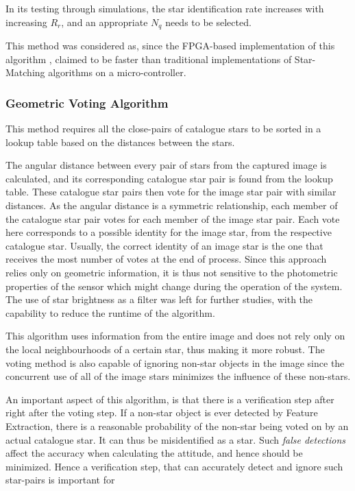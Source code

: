In its testing through simulations, the star identification rate increases with increasing $R_r$, and an appropriate $N_q$ needs to be selected.

This method was considered as, since the FPGA-based implementation of this algorithm \cite{zhao2017real}, claimed to be faster than traditional implementations of Star-Matching algorithms on a micro-controller.


\subsubsection{Geometric Voting Algorithm}
This method \cite{kolomenkin2008geometric} requires all the close-pairs of catalogue stars to be sorted in a lookup table based on the distances between the stars.

The angular distance between every pair of stars from the captured image is calculated, and its corresponding catalogue star pair is found from the lookup table. These catalogue star pairs then vote for the image star pair with similar distances. As the angular distance is a symmetric relationship, each member of the catalogue star pair votes for each member of the image star pair. 
Each vote here corresponds to a possible identity for the image star, from the respective catalogue star. Usually, the correct identity of an image star is the one that receives the most number of votes at the end of process. Since this approach relies only on geometric information, it is thus not sensitive to the photometric properties of the sensor which might change during the operation of the system.
The use of star brightness as a filter was left for further studies, with the capability to reduce the runtime of the algorithm.

This algorithm uses information from the entire image and does not rely only on the local neighbourhoods of a certain star, thus making it more robust. The voting method is also capable of ignoring non-star objects in the image since the concurrent use of all of the image stars minimizes the influence of these non-stars.


An important aspect of this algorithm, is that there is a verification step after right after the voting step. 
If a non-star object is ever detected by Feature Extraction, there is a reasonable probability of the non-star being voted on by an actual catalogue star. It can thus be misidentified as a star. Such \textit{false detections} affect the accuracy when calculating the attitude, and hence should be minimized. Hence a verification step, that can accurately detect and ignore such star-pairs is important for 

